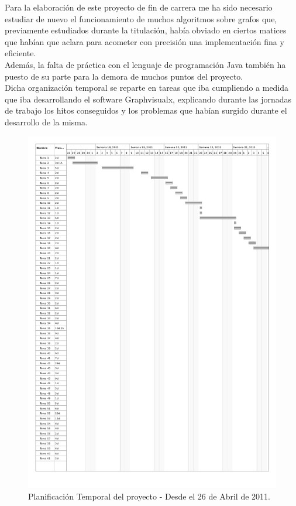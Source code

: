 \documentclass[a4paper,12pt]{article}
\begin{document}
Para la elaboración de este proyecto de fin de carrera me ha sido necesario estudiar de nuevo el funcionamiento de muchos algoritmos sobre grafos que, previamente estudiados durante la titulación, había obviado en ciertos matices que habían que aclara para acometer con precisión una implementación fina y eficiente.\\ Además, la falta de práctica con el lenguaje de programación Java también ha puesto de su parte para la demora de muchos puntos del proyecto.\\

Dicha organización temporal se reparte en tareas que iba cumpliendo a medida que iba desarrollando el software Graphvisualx, explicando durante las jornadas de trabajo los hitos conseguidos y los problemas que habían surgido durante el desarrollo de la misma.

\vfill
\pagebreak
\begin{figure}[H]
\begin{center}
\includegraphics[width=16.5cm]{planificacion_graphvisualx_1.png}
\caption{Planificación Temporal del proyecto - Desde el 26 de Abril de 2011.}
\end{center}
\end{figure}
\end{document}
